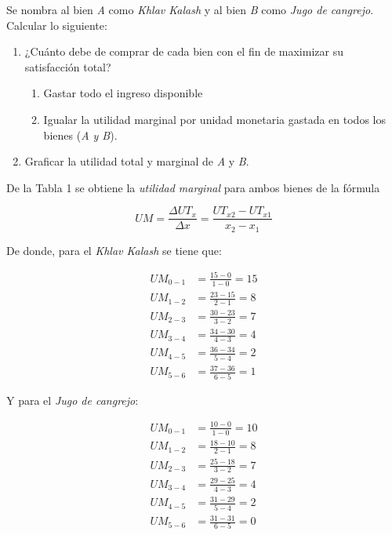 \documentclass[a4paper,12pt]{article}
\begin{document}
Se nombra al bien \emph{A} como \textit{Khlav Kalash} y al bien \emph{B} como \textit{Jugo de cangrejo}.\\

Calcular lo siguiente:\\

\begin{enumerate}[label=\alph*)]

\item ¿Cuánto debe de comprar de cada bien con el fin de maximizar su satisfacción total?\\
	\begin{enumerate}[label=\arabic*.]
	\item Gastar todo el ingreso disponible
	\item Igualar la utilidad marginal por unidad monetaria gastada en todos los bienes (\emph{A y B}).
	\end{enumerate}

\item Graficar la utilidad total y marginal de \emph{A} y \emph{B}.\par

\end{enumerate}

De la Tabla 1 se obtiene la \emph{utilidad marginal} para ambos bienes de la fórmula

\[
	UM = \frac{\Delta UT_x}{\Delta x} = \frac{UT_{x2} - UT_{x1}}{x_2-x_1}
\]

De donde, para el \emph{Khlav Kalash} se tiene que:

\begin{align*}
	UM_{0-1} &= \frac{15 - 0}{1 - 0} = 15 \\
	UM_{1-2} &= \frac{23 - 15}{2 - 1} = 8 \\
	UM_{2-3} &= \frac{30 - 23}{3 - 2} = 7 \\
	UM_{3-4} &= \frac{34 - 30}{4 - 3} = 4 \\
	UM_{4-5} &= \frac{36 - 34}{5 - 4} = 2 \\
	UM_{5-6} &= \frac{37 - 36}{6 - 5} = 1
\end{align*}

Y para el \emph{Jugo de cangrejo}:

\begin{align*}
	UM_{0-1} &= \frac{10 - 0}{1 - 0} = 10 \\
	UM_{1-2} &= \frac{18 - 10}{2 - 1} = 8 \\
	UM_{2-3} &= \frac{25 - 18}{3 - 2} = 7 \\
	UM_{3-4} &= \frac{29 - 25}{4 - 3} = 4 \\
	UM_{4-5} &= \frac{31 - 29}{5 - 4} = 2 \\
	UM_{5-6} &= \frac{31 - 31}{6 - 5} = 0
\end{align*}
\end{document}
